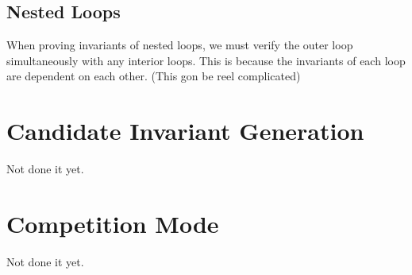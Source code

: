 \documentclass[11pt]{article}
\begin{document}
\subsection{Nested Loops}

When proving invariants of nested loops, we must verify the outer loop simultaneously with any interior loops. This
is because the invariants of each loop are dependent on each other. (This gon be reel complicated)

\section{Candidate Invariant Generation}
Not done it yet.
\section{Competition Mode}
Not done it yet.
\end{document}
